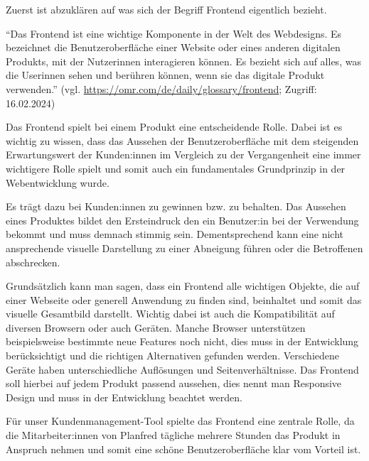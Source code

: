 Zuerst ist abzuklären auf was sich der Begriff Frontend eigentlich bezieht.

“Das Frontend ist eine wichtige Komponente in der Welt des Webdesigns. Es bezeichnet die Benutzeroberfläche einer Website oder eines anderen digitalen Produkts, mit der Nutzerinnen interagieren können. Es bezieht sich auf alles, was die Userinnen sehen und berühren können, wenn sie das digitale Produkt verwenden.”
\newline
(vgl. \url{https://omr.com/de/daily/glossary/frontend}; Zugriff: 16.02.2024)

Das Frontend spielt bei einem Produkt eine entscheidende Rolle. Dabei ist es wichtig zu wissen, dass das Aussehen der Benutzeroberfläche mit dem steigenden Erwartungswert der Kunden:innen im Vergleich zu der Vergangenheit eine immer wichtigere Rolle spielt und somit auch ein fundamentales Grundprinzip in der Webentwicklung wurde. 

Es trägt dazu bei Kunden:innen zu gewinnen bzw. zu behalten. Das Aussehen eines Produktes bildet den Ersteindruck den ein Benutzer:in bei der Verwendung bekommt und muss demnach stimmig sein. Dementsprechend kann eine nicht ansprechende visuelle Darstellung zu einer Abneigung führen oder die Betroffenen abschrecken. 

Grundsätzlich kann man sagen, dass ein Frontend alle wichtigen Objekte, die auf einer Webseite oder generell Anwendung zu finden sind, beinhaltet und somit das visuelle Gesamtbild darstellt. Wichtig dabei ist auch die Kompatibilität auf diversen Browsern oder auch Geräten. Manche Browser unterstützen beispielsweise bestimmte neue Features noch nicht, dies muss in der Entwicklung berücksichtigt und die richtigen Alternativen gefunden werden. Verschiedene Geräte haben unterschiedliche Auflösungen und Seitenverhältnisse. Das Frontend soll hierbei auf jedem Produkt passend aussehen, dies nennt man Responsive Design und muss in der Entwicklung beachtet werden.

Für unser Kundenmanagement-Tool spielte das Frontend eine zentrale Rolle, da die Mitarbeiter:innen von Planfred tägliche mehrere Stunden das Produkt in Anspruch nehmen und somit eine schöne Benutzeroberfläche klar vom Vorteil ist.
\cite{frontend_grundlagen}
